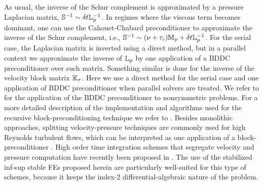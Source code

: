 As usual, the inverse of the Schur complement is approximated by a pressure Laplacian matrix, $\mathbb{S}^{-1}\sim \delta t \mathbb{L}_p^{-1}$. In regimes where the viscous term becomes dominant, one can use the Cahouet-Chabard preconditioner to approximate the inverse of the Schur complement, i.e., $\mathbb{S}^{-1}\sim (\nu+\tau_c)\mathbb{M}_p + \delta t \mathbb{L}_p^{-1}$. For the serial case, the Laplacian matrix is inverted using a direct method, but in a parallel context we approximate the inverse of $\mathbb{L}_p$ by one application of a BDDC preconditioner over such matrix. Something similar is done for the inverse of the velocity block matrix $\mathbb{K}_\tau$. Here we use a direct method for the serial case and one application of BDDC preconditioner when parallel solvers are treated. We refer to \cite{yano_bddc_2010} for the application of the BDDC preconditioner to nonsymmetric problems. For a more detailed description of the implementation and algorithms used for the recursive block-preconditioning technique we refer to \cite{badia_block_2014}. Besides monolithic approaches, splitting velocity-pressure techniques are commonly used for high Reynolds turbulent flows, which can be interpreted as one application of a block-preconditioner \cite{elman_finite_2005,badia_algebraic_2008}. High order time integration schemes that segregate velocity and pressure computation have recently been proposed in \cite{colomes_segregated_2015}. The use of the stabilized inf-sup stable FEs proposed herein are particularly well-suited for this type of schemes, because it keeps the index-2 differential-algebraic nature of the problem. 

